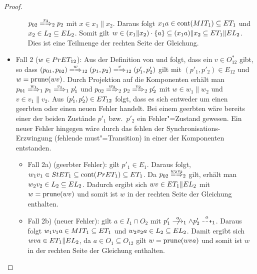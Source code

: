\begin{proof}
\begin{itemize}
\begin{itemize}
        $p_{02}\weakmay[x_2]_2 p_2$ mit $x\in x_1\|x_2$. Daraus folgt $x_1a\in
        \mathrm{cont} (MIT _1) \subseteq ET _1$ und $x_2\in L_2\subseteq EL _2$.
        Somit gilt $w\in (x_1\|x_2) \cdot \{a\} \subseteq (x_1a)\|x_2\subseteq
        ET _1\|EL _2$. Dies ist eine Teilmenge der rechten Seite der Gleichung.
    \end{itemize}
  \item Fall 2 ($w\in PrET _{12}$): Aus der Definition von \PrET{} und \prune{}
    folgt, dass ein $v\in O_{12}^*$ gibt, so dass $(p_{01},p_{02})
      \weakmay[w]_{12} (p_1,p_2) \weakmay[v]_{12} (p'_1,p'_2)$ gilt mit
      $(p'_1,p'_2)\in E_{12}$ und $w=\mathrm{prune} (wv)$. Durch Projektion auf die
      Komponenten erhält man $p_{01} \weakmay[w_1]_1 p_1 \weakmay[v_1]_1 p'_1$
      und $p_{02} \weakmay[w_2]_2 p_2 \weakmay[v_2]_2 p'_2$ mit $w\in w_1\|w_2$
      und $v\in v_1\|v_2$. Aus $(p'_1,p'_2)\in ET _{12}$ folgt, dass es sich
      entweder um einen geerbten oder einen neuen Fehler handelt. Bei einem
      geerbten wäre bereits einer der beiden Zustände $p'_1$ bzw.\ $p'_2$ ein
      Fehler"=Zustand gewesen. Ein neuer Fehler hingegen wäre
      durch das fehlen der Synchronisations-Erzwingung (fehlende
      must"=Transition) in einer der Komponenten entstanden.
    \begin{itemize}
      \item Fall 2a) (geerbter Fehler): \OBdA{} gilt $p'_1\in E_1$. Daraus
        folgt, $w_1v_1\in StET_1 \subseteq \mathrm{cont} (PrET _1) \subseteq ET _1$.
        Da $p_{02} \weakmay[w_2v_2]_2$ gilt, erhält man $w_2v_2\in L_2\subseteq
        EL _2$. Dadurch ergibt sich $wv\in ET _1\|EL _2$ mit $w=\mathrm{prune} (wv)$
        und somit ist $w$ in der rechten Seite der Gleichung enthalten.
      \item Fall 2b) (neuer Fehler): \OBdA{} gilt $a\in I_1\cap
        O_2$ mit $p'_1\nmust[a]_1\land p'_2\may[a]_1$. Daraus folgt $w_1v_1a\in
        MIT _1 \subseteq ET _1$ und $w_2v_2a\in L_2 \subseteq EL _2$. Damit
        ergibt sich $wva\in ET _1\|EL_2$, da $a\in O_1\subseteq O_{12}$ gilt
        $w=\mathrm{prune} (wva)$ und somit ist $w$ in der rechten Seite der Gleichung
        enthalten.
    \end{itemize}
  \end{itemize}


\end{proof}
